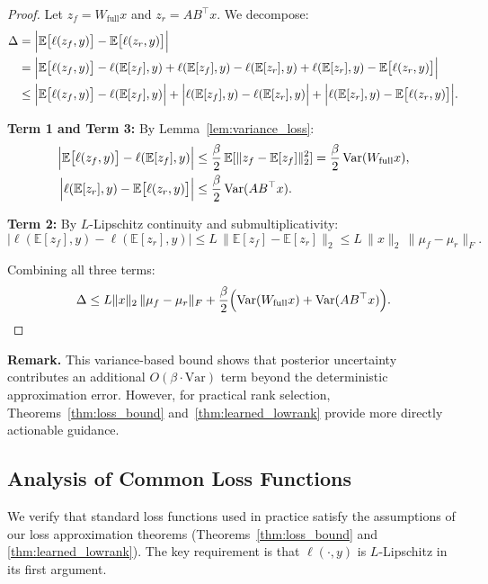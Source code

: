 \documentclass{article}
\theoremstyle{plain}
\theoremstyle{definition}
\theoremstyle{remark}
\begin{document}
\begin{proof}
Let $z_f = W_{\mathrm{full}}x$ and $z_r = AB^\top x$. We decompose:
\begin{align*}
\Delta
&= \Bigl|\mathbb{E}\bigl[\ell(z_f,y)\bigr]-\mathbb{E}\bigl[\ell(z_r,y)\bigr]\Bigr| \\
&= \Bigl|\mathbb{E}\bigl[\ell(z_f,y)\bigr]-\ell(\mathbb{E}[z_f],y)
      +\ell(\mathbb{E}[z_f],y)-\ell(\mathbb{E}[z_r],y)
      +\ell(\mathbb{E}[z_r],y)-\mathbb{E}\bigl[\ell(z_r,y)\bigr]\Bigr| \\
&\le \Bigl|\mathbb{E}\bigl[\ell(z_f,y)\bigr]-\ell(\mathbb{E}[z_f],y)\Bigr|
   + \Bigl|\ell(\mathbb{E}[z_f],y)-\ell(\mathbb{E}[z_r],y)\Bigr|
   + \Bigl|\ell(\mathbb{E}[z_r],y)-\mathbb{E}\bigl[\ell(z_r,y)\bigr]\Bigr|.
\end{align*}

\textbf{Term 1 and Term 3:} By Lemma~\ref{lem:variance_loss}:
\begin{align*}
\Bigl|\mathbb{E}\bigl[\ell(z_f,y)\bigr]-\ell(\mathbb{E}[z_f],y)\Bigr|
&\le \frac{\beta}{2}\,\mathbb{E}[\|z_f - \mathbb{E}[z_f]\|_2^2]
= \frac{\beta}{2}\,\mathrm{Var}(W_{\mathrm{full}}x), \\
\Bigl|\ell(\mathbb{E}[z_r],y)-\mathbb{E}\bigl[\ell(z_r,y)\bigr]\Bigr|
&\le \frac{\beta}{2}\,\mathrm{Var}(AB^\top x).
\end{align*}

\textbf{Term 2:} By $L$-Lipschitz continuity and submultiplicativity:
\[
\bigl|\ell(\mathbb{E}[z_f],y)-\ell(\mathbb{E}[z_r],y)\bigr|
\le L\,\|\mathbb{E}[z_f] - \mathbb{E}[z_r]\|_2
\le L\,\|x\|_2\,\|\mu_f-\mu_r\|_F.
\]

Combining all three terms:
\[
\Delta
\le
L\|x\|_2\,\|\mu_f-\mu_r\|_F
+\frac{\beta}{2}\Bigl(\mathrm{Var}(W_{\mathrm{full}}x)+\mathrm{Var}(AB^\top x)\Bigr).
\]
\end{proof}

\textbf{Remark.} This variance-based bound shows that posterior uncertainty contributes an additional $O(\beta \cdot \mathrm{Var})$ term beyond the deterministic approximation error. However, for practical rank selection, Theorems~\ref{thm:loss_bound} and~\ref{thm:learned_lowrank} provide more directly actionable guidance.
\subsection{Analysis of Common Loss Functions}\label{app:loss_verification}

We verify that standard loss functions used in practice satisfy the assumptions of our loss approximation theorems (Theorems~\ref{thm:loss_bound} and \ref{thm:learned_lowrank}). The key requirement is that $\ell(\cdot, y)$ is $L$-Lipschitz in its first argument.
\end{document}
